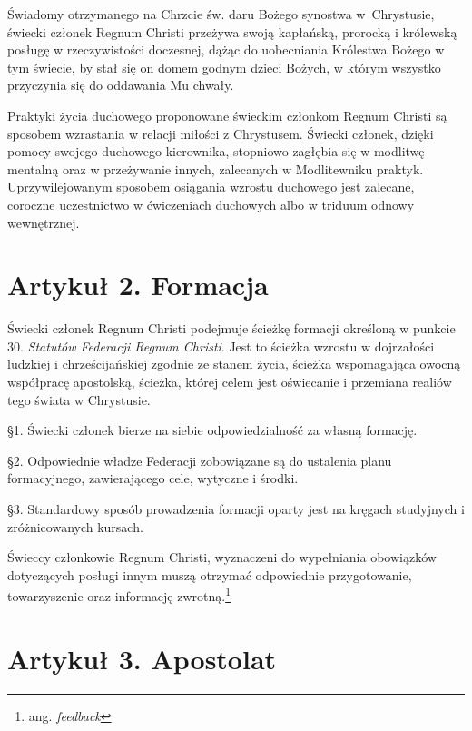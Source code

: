 \filbreak{}

 Świadomy otrzymanego na Chrzcie św. daru Bożego synostwa \mbox{w Chrystusie}, świecki członek Regnum Christi przeżywa swoją kapłańską, prorocką i królewską posługę w rzeczywistości doczesnej, dążąc do uobecniania Królestwa Bożego w tym świecie, by stał się on domem godnym dzieci Bożych, w którym wszystko przyczynia się do oddawania Mu chwały.


 Praktyki życia duchowego proponowane świeckim członkom Regnum Christi są sposobem wzrastania w relacji miłości z Chrystusem. Świecki członek, dzięki pomocy swojego duchowego kierownika, stopniowo zagłębia się w modlitwę mentalną oraz w przeżywanie innych, zalecanych w Modlitewniku praktyk. Uprzywilejowanym sposobem osiągania wzrostu duchowego jest zalecane, coroczne uczestnictwo w ćwiczeniach duchowych albo w triduum odnowy wewnętrznej.


\section{Artykuł 2. Formacja}

 Świecki członek Regnum Christi podejmuje ścieżkę formacji określoną w punkcie 30. {\em Statutów Federacji Regnum Christi}. Jest to ścieżka wzrostu w dojrzałości ludzkiej i chrześcijańskiej zgodnie ze stanem życia, ścieżka wspomagająca owocną współpracę apostolską, ścieżka, której celem jest oświecanie i przemiana realiów tego świata w Chrystusie. 

\filbreak{}

\S{}1. Świecki członek bierze na siebie odpowiedzialność za własną formację.

\S{}2. Odpowiednie władze Federacji zobowiązane są do ustalenia planu formacyjnego, zawierającego cele, wytyczne i środki.

\S{}3. Standardowy sposób prowadzenia formacji oparty jest na kręgach studyjnych i zróżnicowanych kursach.


 Świeccy członkowie Regnum Christi, wyznaczeni do wypełniania obowiązków dotyczących posługi innym muszą otrzymać odpowiednie przygotowanie, towarzyszenie oraz informację zwrotną.\footnote{ang. {\em feedback}}


\section{Artykuł 3. Apostolat}

